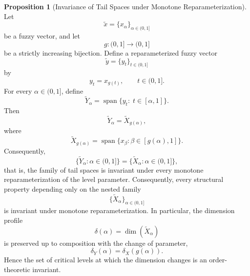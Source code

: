 \documentclass[preprint,12pt]{elsarticle}
\theoremstyle{definition}
\newtheorem{proposition}{Proposition}[section]
\begin{document}
\begin{proposition}[Invariance of Tail Spaces under Monotone Reparameterization]
	Let
	\[
	\widetilde{x}
	=
	\{x_\alpha\}_{\alpha\in(0,1]}
	\]
	be a fuzzy vector, and let
	\[
	g:(0,1]\longrightarrow(0,1]
	\]
	be a strictly increasing bijection.
	Define a reparameterized fuzzy vector
	\[
	\widetilde{y}
	=
	\{y_t\}_{t\in(0,1]}
	\]
	by
	\[
	y_t=x_{g(t)},
	\qquad t\in(0,1].
	\]
	For every $\alpha\in(0,1]$, define
	\[
	\widetilde{Y}_\alpha
	=
	\operatorname{span}
	\{y_t:\;t\in[\alpha,1]\}.
	\]
	Then
	\[
	\widetilde{Y}_\alpha
	=
	\widetilde{X}_{g(\alpha)},
	\]
	where
	\[
	\widetilde{X}_{g(\alpha)}
	=
	\operatorname{span}
	\{x_\beta:\beta\in[g(\alpha),1]\}.
	\]
	Consequently,
	\[
	\{\widetilde{Y}_\alpha:\alpha\in(0,1]\}
	=
	\{\widetilde{X}_\alpha:\alpha\in(0,1]\},
	\]
	that is, the family of tail spaces is invariant under every monotone
	reparameterization of the level parameter.
	Consequently, every structural property depending only on the nested family
	\[
	\{\widetilde X_\alpha\}_{\alpha\in(0,1]}
	\]
	is invariant under monotone reparameterization.
	In particular, the dimension profile
	\[
	\delta(\alpha)
	=
	\dim(\widetilde X_\alpha)
	\]
	is preserved up to composition with the change of parameter,
	\[
	\delta_Y(\alpha)
	=
	\delta_X(g(\alpha)).
	\]
	Hence the set of critical levels at which the dimension changes is an
	order-theoretic invariant.
\end{proposition}
\end{document}
